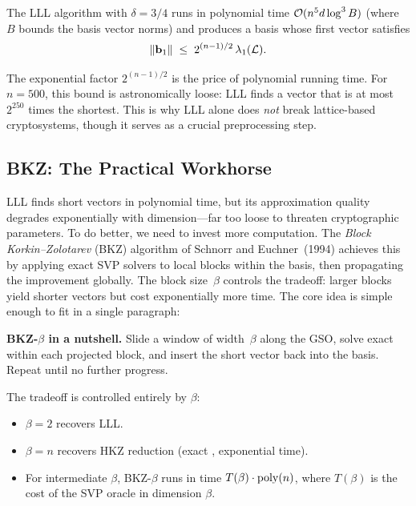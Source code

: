 \begin{theorem}
\label{thm:lll-guarantees}
The LLL algorithm with $\delta = 3/4$ runs in polynomial time $\mathcal{O}(n^5 d\log^3 B)$ (where $B$ bounds the basis vector norms) and produces a basis whose first vector satisfies
\begin{equation}
\label{eq:lll-bound}
\left\lVert \mathbf{b}_1 \right\rVert \;\leq\; 2^{(n-1)/2}\,\lambda_1(\mathcal{L}).
\end{equation}
\end{theorem}

The exponential factor $2^{(n-1)/2}$ is the price of polynomial running time.  For $n = 500$, this bound is astronomically loose: LLL finds a vector that is at most $2^{250}$ times the shortest.  This is why LLL alone does \emph{not} break lattice-based cryptosystems, though it serves as a crucial preprocessing step.


\subsection{BKZ: The Practical Workhorse}
\label{subsec:bkz}

LLL finds short vectors in polynomial time, but its approximation quality degrades exponentially with dimension---far too loose to threaten cryptographic parameters.  To do better, we need to invest more computation.  The \emph{Block Korkin--Zolotarev} (BKZ) algorithm of Schnorr and Euchner~(1994) achieves this by applying exact SVP solvers to local blocks within the basis, then propagating the improvement globally.  The block size~$\beta$ controls the tradeoff: larger blocks yield shorter vectors but cost exponentially more time.  The core idea is simple enough to fit in a single paragraph:

\begin{svgraybox}
\textbf{BKZ-$\beta$ in a nutshell.}  Slide a window of width~$\beta$ along the GSO, solve exact \svp{} within each projected block, and insert the short vector back into the basis.  Repeat until no further progress.
\end{svgraybox}

\noindent The tradeoff is controlled entirely by $\beta$:
\begin{itemize}
\item $\beta = 2$ recovers LLL.
\item $\beta = n$ recovers HKZ reduction (exact \svp{}, exponential time).
\item For intermediate $\beta$, BKZ-$\beta$ runs in time $T(\beta)\cdot\operatorname{poly}(n)$, where $T(\beta)$ is the cost of the SVP oracle in dimension $\beta$.
\end{itemize}

